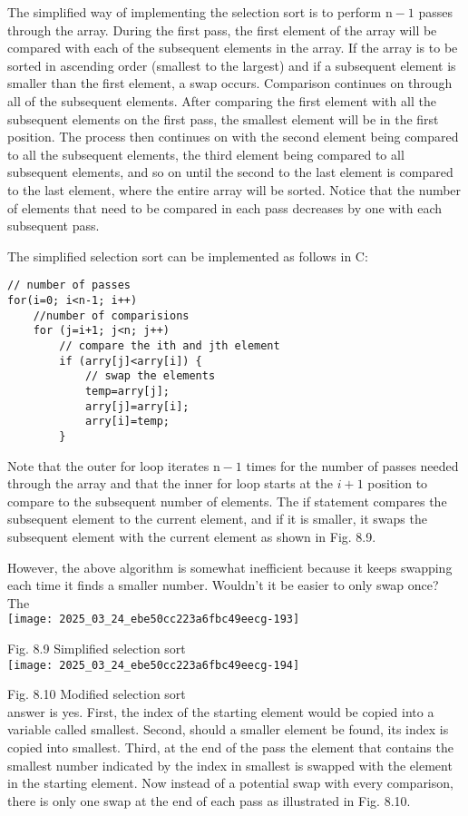 \documentclass[10pt]{article}
\begin{document}
The simplified way of implementing the selection sort is to perform $\mathrm{n}-1$ passes through the array. During the first pass, the first element of the array will be compared with each of the subsequent elements in the array. If the array is to be\\
sorted in ascending order (smallest to the largest) and if a subsequent element is smaller than the first element, a swap occurs. Comparison continues on through all of the subsequent elements. After comparing the first element with all the subsequent elements on the first pass, the smallest element will be in the first position. The process then continues on with the second element being compared to all the subsequent elements, the third element being compared to all subsequent elements, and so on until the second to the last element is compared to the last element, where the entire array will be sorted. Notice that the number of elements that need to be compared in each pass decreases by one with each subsequent pass.

The simplified selection sort can be implemented as follows in C:

\begin{verbatim}
// number of passes
for(i=0; i<n-1; i++)
    //number of comparisions
    for (j=i+1; j<n; j++)
        // compare the ith and jth element
        if (arry[j]<arry[i]) {
            // swap the elements
            temp=arry[j];
            arry[j]=arry[i];
            arry[i]=temp;
        }
\end{verbatim}

Note that the outer for loop iterates $\mathrm{n}-1$ times for the number of passes needed through the array and that the inner for loop starts at the $i+1$ position to compare to the subsequent number of elements. The if statement compares the subsequent element to the current element, and if it is smaller, it swaps the subsequent element with the current element as shown in Fig. 8.9.

However, the above algorithm is somewhat inefficient because it keeps swapping each time it finds a smaller number. Wouldn't it be easier to only swap once? The\\
\texttt{[image: 2025\_03\_24\_ebe50cc223a6fbc49eecg-193]}

Fig. 8.9 Simplified selection sort\\
\texttt{[image: 2025\_03\_24\_ebe50cc223a6fbc49eecg-194]}

Fig. 8.10 Modified selection sort\\
answer is yes. First, the index of the starting element would be copied into a variable called smallest. Second, should a smaller element be found, its index is copied into smallest. Third, at the end of the pass the element that contains the smallest number indicated by the index in smallest is swapped with the element in the starting element. Now instead of a potential swap with every comparison, there is only one swap at the end of each pass as illustrated in Fig. 8.10.
\end{document}
